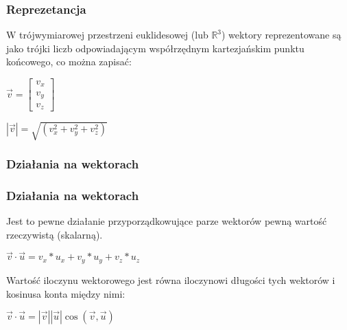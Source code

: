 \documentclass{beamer}
\begin{document}
\begin{frame}
  \frametitle{Reprezetancja}
    \begin{definition}
  W trójwymiarowej przestrzeni euklidesowej (lub $ \mathbb{R}^3 $) wektory reprezentowane są jako trójki liczb odpowiadającym współrzędnym kartezjańskim punktu końcowego, co można zapisać: \\
  \begin{center}
    \begin{math}
      \overrightarrow{v} =
      \begin{bmatrix}
        v_{x} \\
        v_{y} \\
        v_{z}
      \end{bmatrix}
    \end{math}
  \end{center}
  \end{definition}

  \pause

  \begin{definition}
    \begin{math}
      |\overrightarrow{v}| = \sqrt{(v_{x}^2 + v_{y}^2 + v_{z}^2)}
    \end{math}
  \end{definition}

\end{frame}

\subsubsection{Działania na wektorach}
\begin{frame}
  \frametitle{Działania na wektorach}
  \begin{definition}
    Jest to pewne działanie przyporządkowujące parze wektorów pewną wartość rzeczywistą (skalarną). \\
    \begin{center}
      \begin{math}
        \overrightarrow{v} \cdot \overrightarrow{u} = v_{x}*u_{x} + v_{y}*u_{y} + v_{z}*u_{z}
      \end{math}
    \end{center}
  \end{definition}

  \pause

  \begin{definition}
    Wartość iloczynu wektorowego jest równa iloczynowi długości tych wektorów i kosinusa konta między nimi: \\

  \begin{center}
    \begin{math}
      \overrightarrow{v} \cdot \overrightarrow{u} = |\overrightarrow{v}||\overrightarrow{u}|\cos(\overrightarrow{v}, \overrightarrow{u})
    \end{math}
  \end{center}
  \end{definition}
\end{frame}
\end{document}
